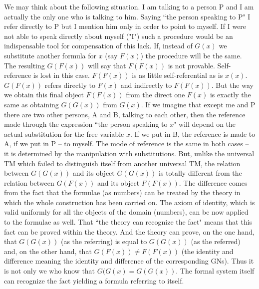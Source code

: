We may think about the following situation. I am talking to a person P and I am actually the only one who is 
talking to him. Saying ``the person speaking to P" I refer directly to P but I mention him only in order to point to 
myself. If I were not able to speak directly about myself ("I") such a procedure would be an indispensable tool for 
compensation of this lack.
If, instead of $G(x)$ we substitute another formula for $x$ (say $F(x)$) the procedure will be the same. The resulting 
$G(F(x))$ will say that $F(F(x))$ is not provable. Self-reference is lost in this case. 
$F(F(x))$ is as little self-referential 
as is $x(x)$. $G(F(x))$ refers directly to $F(x)$ and indirectly to $F(F(x))$. But the way we obtain this final object 
$F(F(x))$ from the direct one $F(x)$ is exactly the same as obtaining $G(G(x))$ from $G(x)$.
 If we imagine that except me and P there are two other 
persons, A and B, talking to each other, then the reference made through the expression ``the person speaking to $x$" 
will depend on the actual substitution for the free variable $x$. If we put in B, the reference is made to A, if we put 
in P -- to myself. The mode of reference is the same in both cases -- it is determined by the manipulation with 
substitutions. But, unlike the universal TM which failed to distinguish itself from another universal TM, the 
relation between $G(G(x))$ and its object $G(G(x))$ is totally different from the relation between $G(F(x))$ and its object 
$F(F(x)).$ The difference comes from the fact that the formulae (as numbers) can be treated by the theory in which 
the whole construction has been carried on. The axiom of identity, which is valid uniformly for all the objects of 
the domain (numbers), can be now applied to the formulae as well. That ``the theory can recognize the fact" means 
that this fact can be proved within the theory. And the theory can prove, on the one hand, that $G(G(x))$ (as the 
referring) is equal to $G(G(x))$ (as the referred) and, on the other hand, that 
$G(F(x))\not=F(F(x))$ (the identity and 
difference meaning the identity and difference of the corresponding GNs). Thus it is not only we who know that 
$G(G(x)=G(G(x))$. The formal system itself can recognize the fact yielding a formula referring to itself.

